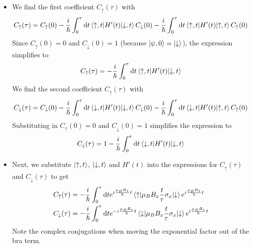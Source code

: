 \documentclass[11pt, a4paper]{article}
\newcommand{\diff}{\mathop{}\!\mathrm{d}} %
\newcommand{\p}{\psi}  %
\newcommand{\ua}{\uparrow}  %
\newcommand{\da}{\downarrow}  %
\begin{document}
\begin{itemize}
	\item We find the first coefficient $ C_{\ua}(\tau) $ with
	\begin{equation*}
		C_{\ua}(\tau) = C_{\ua}(0) - \frac{i}{\hbar}\int_{0}^{\tau}\diff t \mel{\ua, t}{H'(t)}{\da, t}C_{\da}(0) - \frac{i}{\hbar}\int_{0}^{\tau}\diff t \mel{\ua, t}{H'(t)}{\ua, t}C_{\ua}(0)
	\end{equation*}
	Since $ C_{\ua}(0) = 0 $ and $ C_{\da}(0) = 1 $ (because $ \ket{\p, 0} = \ket{\da} $), the expression simplifies to
	\begin{equation*}
		C_{\ua}(\tau) = - \frac{i}{\hbar}\int_{0}^{\tau}\diff t \mel{\ua, t}{H'(t)}{\da, t}
	\end{equation*}
	We find the second coefficient $ C_{\ua}(\tau) $ with
	\begin{equation*}
		C_{\da}(\tau) = C_{\da}(0) - \frac{i}{\hbar}\int_{0}^{\tau}\diff t \mel{\da, t}{H'(t)}{\da, t}C_{\da}(0) - \frac{i}{\hbar}\int_{0}^{\tau}\diff t \mel{\da, t}{H'(t)}{\ua, t}C_{\ua}(0)
	\end{equation*}
	Substituting in $ C_{\ua}(0) = 0 $ and $ C_{\da}(0) = 1 $ simplifies the expression to
	\begin{equation*}
		C_{\da}(\tau) = 1 - \frac{i}{\hbar}\int_{0}^{\tau}\diff t \mel{\da, t}{H'(t)}{\da, t}
	\end{equation*}
	
	\item Next, we substitute $ \ket{\ua, t} $, $ \ket{\da, t} $ and $ H'(t) $ into the expressions for $ C_{\ua}(\tau) $ and $ C_{\da}(\tau) $ to get
	\begin{align*}
		& C_{\ua}(\tau) = - \frac{i}{\hbar}\int_{0}^{\tau} \diff t e^{i\frac{\mu_{B}B_{z}}{\hbar}t}\mel{\ua}{\mu_{B}B_{x}\frac{t}{\tau}\sigma_{x}}{\da} e^{i\frac{\mu_{B}B_{z}}{\hbar}t}\\
		& C_{\da}(\tau) = - \frac{i}{\hbar}\int_{0}^{\tau} \diff t e^{-i\frac{\mu_{B}B_{z}}{\hbar}t}\mel{\da}{\mu_{B}B_{x}\frac{t}{\tau}\sigma_{x}}{\da} e^{i\frac{\mu_{B}B_{z}}{\hbar}t}
	\end{align*}
	Note the complex conjugations when moving the exponential factor out of the bra term.
	

\end{itemize}
\end{document}
